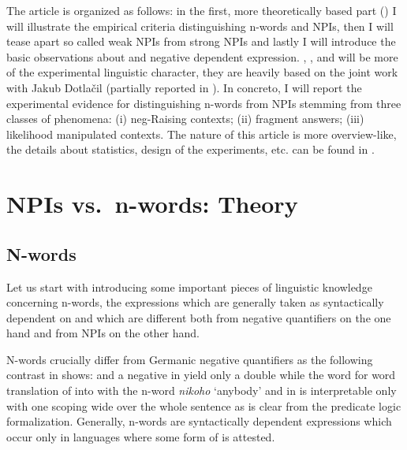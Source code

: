 \documentclass[output=paper, colorlinks, citecolor=brown, newtxmath]{langsci/langscibook}
\begin{document}
\noindent The article is organized as follows: in the first, more theoretically based part () I will illustrate the empirical criteria distinguishing n-words and NPIs, then I will tease apart so called weak NPIs from strong NPIs and lastly I will introduce the basic observations about  and negative dependent expression.  , , and  will be more of the experimental linguistic character, they are heavily based on the joint work with Jakub Dotlačil (partially reported in \citealt{dovcekal2016experimentala,docekaldotlacilsubedinb,docekaldotlacilsubber}). In concreto, I will report the experimental evidence for distinguishing n-words from NPIs stemming from three classes of phenomena: (i) neg-Raising contexts; (ii) fragment answers; (iii) likelihood manipulated contexts. The nature of this article is more overview-like, the details about statistics, design of the experiments, etc. can be found in \cite{dovcekal2016experimentala,docekaldotlacilsubedinb,docekaldotlacilsubber,docekalsafratovaoli}.

\section{NPIs vs.~n-words: Theory}\label{npis-vs.n-words-theory}
\largerpage
\subsection{N-words}\label{n-words}

Let us start with introducing some important pieces of linguistic knowledge concerning n-words, the expressions which are generally taken as syntactically dependent on  and which are different both from negative quantifiers on the one hand and from NPIs on the other hand.

N-words crucially differ from Germanic negative quantifiers as the following contrast in  shows:   and a negative  in  yield only a double  while the word for word translation of  into  with the n-word \textit{nikoho} `anybody' and  in  is interpretable only with one  scoping wide over the whole sentence as is clear from the predicate logic formalization. Generally, n-words are syntactically dependent expressions which occur only in languages where some form of  is attested.
\end{document}
